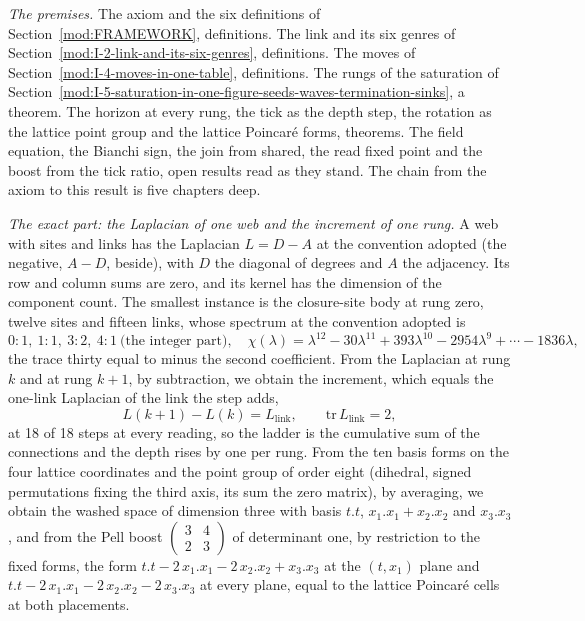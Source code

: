 \begin{chproof}
\textit{The premises.} The axiom and the six definitions of Section~\ref{mod:FRAMEWORK}, definitions. The link and its six genres of Section~\ref{mod:I-2-link-and-its-six-genres}, definitions. The moves of Section~\ref{mod:I-4-moves-in-one-table}, definitions. The rungs of the saturation of Section~\ref{mod:I-5-saturation-in-one-figure-seeds-waves-termination-sinks}, a theorem. The horizon at every rung, the tick as the depth step, the rotation as the lattice point group and the lattice Poincar\'e forms, theorems. The field equation, the Bianchi sign, the join from shared, the read fixed point and the boost from the tick ratio, open results read as they stand. The chain from the axiom to this result is five chapters deep.

\textit{The exact part: the Laplacian of one web and the increment of one rung.} A web with sites and links has the Laplacian $L = D - A$ at the convention adopted (the negative, $A - D$, beside), with $D$ the diagonal of degrees and $A$ the adjacency. Its row and column sums are zero, and its kernel has the dimension of the component count. The smallest instance is the closure-site body at rung zero, twelve sites and fifteen links, whose spectrum at the convention adopted is
\begin{equation}
0{:}1,\ 1{:}1,\ 3{:}2,\ 4{:}1\ \text{(the integer part)},\quad \chi(\lambda)=\lambda^{12}-30\lambda^{11}+393\lambda^{10}-2954\lambda^{9}+\cdots-1836\lambda ,
\end{equation}
the trace thirty equal to minus the second coefficient. From the Laplacian at rung $k$ and at rung $k+1$, by subtraction, we obtain the increment, which equals the one-link Laplacian of the link the step adds,
\begin{equation}
L(k+1)-L(k)=L_{\mathrm{link}},\qquad \mathrm{tr}\,L_{\mathrm{link}}=2,
\end{equation}
at 18 of 18 steps at every reading, so the ladder is the cumulative sum of the connections and the depth rises by one per rung. From the ten basis forms on the four lattice coordinates and the point group of order eight (dihedral, signed permutations fixing the third axis, its sum the zero matrix), by averaging, we obtain the washed space of dimension three with basis $t.t$, $x_1.x_1+x_2.x_2$ and $x_3.x_3$, and from the Pell boost $\begin{pmatrix}3&4\\2&3\end{pmatrix}$ of determinant one, by restriction to the fixed forms, the form $t.t-2\,x_1.x_1-2\,x_2.x_2+x_3.x_3$ at the $(t,x_1)$ plane and $t.t-2\,x_1.x_1-2\,x_2.x_2-2\,x_3.x_3$ at every plane, equal to the lattice Poincar\'e cells at both placements.


\end{chproof}
